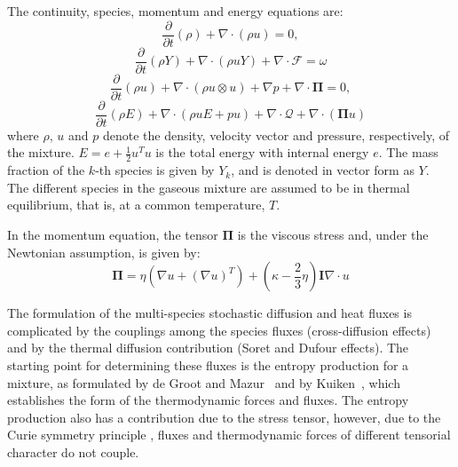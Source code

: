 \documentclass[11pt]{article}
\newcommand{\HeatFlux}{\boldsymbol{\mathcal{Q}}}
\newcommand{\SpeciesFlux}{\boldsymbol{\mathcal{F}}}
\newcommand{\StressTensor}{\boldsymbol{\Pi}}
\newcommand{\half}{\frac{1}{2}}
\begin{document}
The continuity, species, momentum and energy equations are:
\begin{equation}
\frac{\partial }{\partial t} \left( \rho \right)  + { \nabla} \cdot \left( \rho { u} \right) = 0,
\label{eqn:cont}
\end{equation}
\begin{equation}
\frac{\partial }{\partial t} \left( \rho Y \right)  + { \nabla} \cdot \left( \rho { u} Y \right) + { \nabla} \cdot
\SpeciesFlux
=  \omega 
\label{eqn:spec}
\end{equation}
\begin{equation}
\frac{\partial }{\partial t} \left( \rho { u} \right)  + { \nabla} \cdot \left( \rho { u \otimes u } \right) + { \nabla} p + {\nabla} \cdot   \StressTensor = 0,
\label{eqn:mom}
\end{equation}
\begin{equation}
\frac{\partial }{\partial t} \left( \rho E \right)  + { \nabla} \cdot \left( \rho { u} E + p { u}  \right) + { \nabla} \cdot  { \HeatFlux}  + \nabla \cdot (\StressTensor u)
\label{eqn:energy}
\end{equation}
where $\rho$, ${u}$ and $p$ denote the density, velocity vector and pressure, respectively, of the mixture.
$E = e + \half u^T u$ is the total energy with internal energy $e$.
The mass fraction of the $k$-th species is given by $Y_k$, and is denoted in vector form as $Y$.
The different species in the gaseous mixture are assumed to be in thermal equilibrium,
that is, at a common temperature, $T$.

In the momentum equation, the tensor $\StressTensor$ is the viscous stress and, under the Newtonian assumption, is given by:
\begin{equation}
\StressTensor = \eta ( \nabla u + ( \nabla u )^T) + ( \kappa - \frac{2}{3} \eta) \mathbf{I} \nabla \cdot u
\end{equation}

The formulation of the multi-species stochastic diffusion and heat fluxes is complicated by the couplings among the species fluxes (cross-diffusion effects) and by the thermal diffusion contribution (Soret and Dufour effects).
The starting point for determining these fluxes
is the entropy production for a mixture, as formulated by de Groot and Mazur~\cite{DM_63} and by Kuiken~\cite{NewIrrevThermoBook},
which establishes the form of the thermodynamic forces and fluxes.
The entropy production also has a contribution due to the stress tensor, however,
due to the Curie symmetry principle \cite{DM_63}, fluxes and thermodynamic forces of different tensorial
character do not couple.
\end{document}
